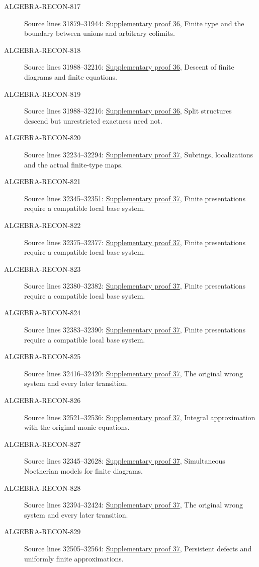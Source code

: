 \begin{description}
\item[ALGEBRA-RECON-817] Source lines 31879--31944: \hyperlink{algebra_colimit_categories_notes_20260928}{Supplementary proof 36}, Finite type and the boundary between unions and arbitrary colimits.
\item[ALGEBRA-RECON-818] Source lines 31988--32216: \hyperlink{algebra_colimit_categories_notes_20260928}{Supplementary proof 36}, Descent of finite diagrams and finite equations.
\item[ALGEBRA-RECON-819] Source lines 31988--32216: \hyperlink{algebra_colimit_categories_notes_20260928}{Supplementary proof 36}, Split structures descend but unrestricted exactness need not.
\item[ALGEBRA-RECON-820] Source lines 32234--32294: \hyperlink{algebra_noetherian_approximation_notes_20260928}{Supplementary proof 37}, Subrings, localizations and the actual finite-type maps.
\item[ALGEBRA-RECON-821] Source lines 32345--32351: \hyperlink{algebra_noetherian_approximation_notes_20260928}{Supplementary proof 37}, Finite presentations require a compatible local base system.
\item[ALGEBRA-RECON-822] Source lines 32375--32377: \hyperlink{algebra_noetherian_approximation_notes_20260928}{Supplementary proof 37}, Finite presentations require a compatible local base system.
\item[ALGEBRA-RECON-823] Source lines 32380--32382: \hyperlink{algebra_noetherian_approximation_notes_20260928}{Supplementary proof 37}, Finite presentations require a compatible local base system.
\item[ALGEBRA-RECON-824] Source lines 32383--32390: \hyperlink{algebra_noetherian_approximation_notes_20260928}{Supplementary proof 37}, Finite presentations require a compatible local base system.
\item[ALGEBRA-RECON-825] Source lines 32416--32420: \hyperlink{algebra_noetherian_approximation_notes_20260928}{Supplementary proof 37}, The original wrong system and every later transition.
\item[ALGEBRA-RECON-826] Source lines 32521--32536: \hyperlink{algebra_noetherian_approximation_notes_20260928}{Supplementary proof 37}, Integral approximation with the original monic equations.
\item[ALGEBRA-RECON-827] Source lines 32345--32628: \hyperlink{algebra_noetherian_approximation_notes_20260928}{Supplementary proof 37}, Simultaneous Noetherian models for finite diagrams.
\item[ALGEBRA-RECON-828] Source lines 32394--32424: \hyperlink{algebra_noetherian_approximation_notes_20260928}{Supplementary proof 37}, The original wrong system and every later transition.
\item[ALGEBRA-RECON-829] Source lines 32505--32564: \hyperlink{algebra_noetherian_approximation_notes_20260928}{Supplementary proof 37}, Persistent defects and uniformly finite approximations.
\end{description}


